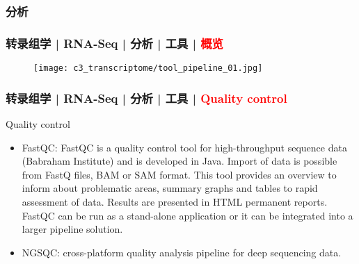 \subsubsection{分析}
\begin{frame}
  \frametitle{转录组学 | RNA-Seq | 分析 | 工具 | \textcolor{red}{概览}}
  \begin{figure}
    \centering
    \texttt{[image: c3\_transcriptome/tool\_pipeline\_01.jpg]}
  \end{figure}
\end{frame}

\begin{frame}
  \frametitle{转录组学 | RNA-Seq | 分析 | 工具 | \textcolor{red}{Quality control}}
  \begin{block}{Quality control}
    \begin{itemize}
      \item FastQC: FastQC is a quality control tool for high-throughput sequence data (Babraham Institute) and is developed in Java. Import of data is possible from FastQ files, BAM or SAM format. This tool provides an overview to inform about problematic areas, summary graphs and tables to rapid assessment of data. Results are presented in HTML permanent reports. FastQC can be run as a stand-alone application or it can be integrated into a larger pipeline solution.
      \item NGSQC: cross-platform quality analysis pipeline for deep sequencing data.
    \end{itemize}
  \end{block}
\end{frame}

